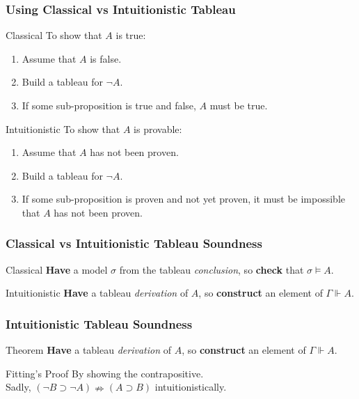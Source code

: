 \documentclass[mathserif]{beamer}
\def\imp{\supset}
\newcommand{\sat}[1]{\sigma \vDash #1}
\newcommand{\force}[1]{\Gamma \Vdash #1}
\begin{document}
\begin{frame}
\frametitle{Using Classical vs Intuitionistic Tableau}

\begin{block}{Classical}
To show that $A$ is true:
\begin{enumerate}
\item Assume that $A$ is false.
\item Build a tableau for $\neg A$.
\item If some sub-proposition is true and false, $A$ must be true.
\end{enumerate}
\end{block}

\begin{block}{Intuitionistic}
To show that $A$ is provable:
\begin{enumerate}
\item Assume that $A$ has not been proven.
\item Build a tableau for $\neg A$.
\item If some sub-proposition is proven and not yet proven,
it must be impossible that $A$ has not been proven.
\end{enumerate}
\end{block}

\end{frame}

\begin{frame}
\frametitle{Classical vs Intuitionistic Tableau Soundness}

\begin{block}{Classical}
{\bf Have} a model $\sigma$ from the tableau {\it conclusion}, so
{\bf check} that $\sat{A}$.
\end{block}

\begin{block}{Intuitionistic}
{\bf Have} a tableau {\it derivation} of $A$, so
{\bf construct} an element of $\force{A}$.
\end{block}

\end{frame}

\begin{frame}
\frametitle{Intuitionistic Tableau Soundness}

\begin{block}{Theorem}
{\bf Have} a tableau {\it derivation} of $A$, so
{\bf construct} an element of $\force{A}$.
\end{block}

\begin{block}{Fitting's Proof}
By showing the contrapositive.\\
Sadly, $(\neg B \imp \neg A) \nRightarrow (A \imp B)$ intuitionistically.
\end{block}

\end{frame}
\end{document}
